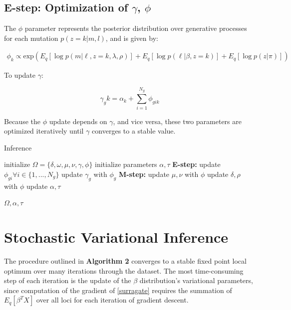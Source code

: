 \documentclass{article}
\begin{document}
\subsection{E-step: Optimization of $\gamma$, $\phi$}

The $\phi$ parameter represents the posterior distribution over generative processes for each mutation $p(z=k | m, l)$, and is given by:

\begin{equation}
\begin{split}
\phi_k \propto \textrm{exp} \left( E_q[\log p(m|\ell,z=k,\lambda,\rho)] + E_q[\log p(\ell|\beta, z=k)] + E_q [\log p(z | \pi ) ] \right)
\end{split}
\end{equation}

To update $\gamma$:

\begin{equation}
\gamma_gk = \alpha_k + \sum_{i=1}^{N_g} \phi_{gik}
\end{equation}

Because the $\phi$ update depends on $\gamma$, and vice versa, these two parameters are optimized iteratively until $\gamma$ converges to a stable value.


\begin{algorithm} \label{Inference}
\caption{Inference}
\begin{algorithmic}
  \scriptsize
  \STATE initialize $\Omega = \{\delta, \omega, \mu, \nu, \gamma, \phi\}$
  \STATE initialize parameters $\alpha, \tau$
  	\STATE \textbf{E-step:}
  			\STATE update $\phi_{gi} \forall i \in \{1, ..., N_g\}$
  			\STATE update $\gamma_g$ with $\phi_g$
  		\ENDWHILE
  	\ENDFOR
  	\STATE \textbf{M-step:}
  	\STATE update $\mu,\nu$ with $\phi$
  	\STATE update $\delta, \rho$ with $\phi$
  		\STATE update $\alpha, \tau$
  	\ENDIF
  \ENDWHILE
  
  \RETURN $\Omega, \alpha, \tau$
\end{algorithmic}
\end{algorithm}


\section{Stochastic Variational Inference}

The procedure outlined in \textbf{Algorithm 2} converges to a stable fixed point local optimum over many iterations through the dataset. The most time-consuming step of each iteration  is the update of the $\beta$ distribution's variational parameters, since computation of the gradient of \eqref{surragate} requires the summation of $E_q[\beta^T X]$ over all loci for each iteration of gradient descent. 
\end{document}
